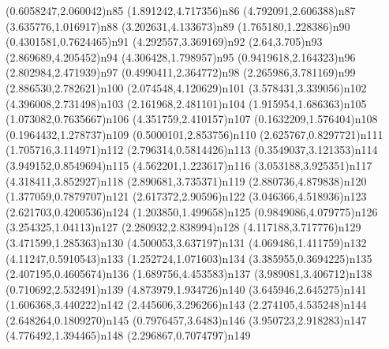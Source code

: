 \pnode(0.6058247,2.060042){n85}
\pnode(1.891242,4.717356){n86}
\pnode(4.792091,2.606388){n87}
\pnode(3.635776,1.016917){n88}
\pnode(3.202631,4.133673){n89}
\pnode(1.765180,1.228386){n90}
\pnode(0.4301581,0.7624465){n91}
\pnode(4.292557,3.369169){n92}
\pnode(2.64,3.705){n93}
\pnode(2.869689,4.205452){n94}
\pnode(4.306428,1.798957){n95}
\pnode(0.9419618,2.164323){n96}
\pnode(2.802984,2.471939){n97}
\pnode(0.4990411,2.364772){n98}
\pnode(2.265986,3.781169){n99}
\pnode(2.886530,2.782621){n100}
\pnode(2.074548,4.120629){n101}
\pnode(3.578431,3.339056){n102}
\pnode(4.396008,2.731498){n103}
\pnode(2.161968,2.481101){n104}
\pnode(1.915954,1.686363){n105}
\pnode(1.073082,0.7635667){n106}
\pnode(4.351759,2.410157){n107}
\pnode(0.1632209,1.576404){n108}
\pnode(0.1964432,1.278737){n109}
\pnode(0.5000101,2.853756){n110}
\pnode(2.625767,0.8297721){n111}
\pnode(1.705716,3.114971){n112}
\pnode(2.796314,0.5814426){n113}
\pnode(0.3549037,3.121353){n114}
\pnode(3.949152,0.8549694){n115}
\pnode(4.562201,1.223617){n116}
\pnode(3.053188,3.925351){n117}
\pnode(4.318411,3.852927){n118}
\pnode(2.890681,3.735371){n119}
\pnode(2.880736,4.879838){n120}
\pnode(1.377059,0.7879707){n121}
\pnode(2.617372,2.90596){n122}
\pnode(3.046366,4.518936){n123}
\pnode(2.621703,0.4200536){n124}
\pnode(1.203850,1.499658){n125}
\pnode(0.9849086,4.079775){n126}
\pnode(3.254325,1.04113){n127}
\pnode(2.280932,2.838994){n128}
\pnode(4.117188,3.717776){n129}
\pnode(3.471599,1.285363){n130}
\pnode(4.500053,3.637197){n131}
\pnode(4.069486,1.411759){n132}
\pnode(4.11247,0.5910543){n133}
\pnode(1.252724,1.071603){n134}
\pnode(3.385955,0.3694225){n135}
\pnode(2.407195,0.4605674){n136}
\pnode(1.689756,4.453583){n137}
\pnode(3.989081,3.406712){n138}
\pnode(0.710692,2.532491){n139}
\pnode(4.873979,1.934726){n140}
\pnode(3.645946,2.645275){n141}
\pnode(1.606368,3.440222){n142}
\pnode(2.445606,3.296266){n143}
\pnode(2.274105,4.535248){n144}
\pnode(2.648264,0.1809270){n145}
\pnode(0.7976457,3.6483){n146}
\pnode(3.950723,2.918283){n147}
\pnode(4.776492,1.394465){n148}
\pnode(2.296867,0.7074797){n149}
